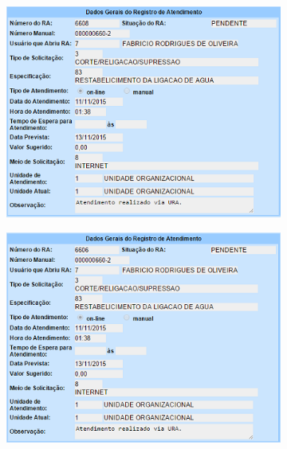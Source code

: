 \begin{apendicesenv}
\begin{figure}[H]
	\centering
	\caption*{\textbf{Solicitar Restabelecimento da Ligação de Água - Cenário 2 Detalhado.}}
	\begin{subfigure}[H]{\textwidth}
		\centering
		\includegraphics{figuras/anexo/restabelecer/detalhe_2.png}
	\end{subfigure}
\end{figure}

\begin{figure}[H]
	\centering
	\caption*{\textbf{Solicitar Restabelecimento da Ligação de Água - Cenário 3 Detalhado.}}
	\begin{subfigure}[H]{\textwidth}
		\centering
		\includegraphics{figuras/anexo/restabelecer/detalhe_3.png}
	\end{subfigure}
\end{figure}


\end{apendicesenv}



